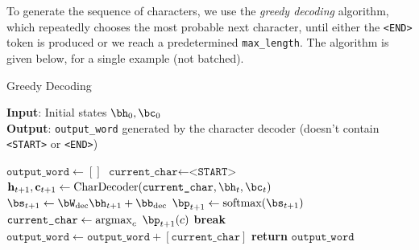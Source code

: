 To generate the sequence of characters, we use the \textit{greedy decoding} algorithm, which repeatedly chooses the most probable next character, until either the \texttt{<END>} token is produced or we reach a predetermined \texttt{max\_length}.
The algorithm is given below, for a single example (not batched).

\begin{algorithm}
\caption{Greedy Decoding}\label{alg:greedy}
\textbf{Input}: Initial states $\bh_0, \bc_0$ \\
\textbf{Output}: \texttt{output\_word} generated by the character decoder (doesn't contain \texttt{<START>} or \texttt{<END>})
\begin{algorithmic}[1]
    \State $\texttt{output\_word} \gets []$ 
    \State $\texttt{current\_char} \gets \texttt{<START>}$
        \State    ${\bf h}_{t+1}, {\bf c}_{t+1} \gets \operatorname{CharDecoder}(\texttt{current\_char}, \bh_t, \bc_t)$ 
        \State $\bs_{t+1} \gets \bW_\text{dec} \bh_{t+1} + \bb_\text{dec}$ 
        \State $\bp_{t+1} \gets \text{softmax} (\bs_{t+1})$ 
        \State $\texttt{current\_char} \gets \operatorname{argmax}_c\ \bp_{t+1}(c)$ 
            \State \textbf{break}
        \EndIf
        \State $\texttt{output\_word} \gets \texttt{output\_word} + [\texttt{current\_char}]$ 
    \EndFor
    \State \textbf{return} $\texttt{output\_word}$
    \EndProcedure
\end{algorithmic}
\end{algorithm}

\newpage

